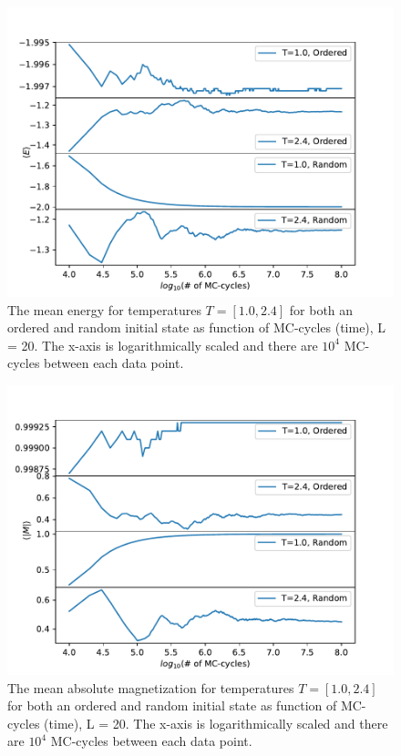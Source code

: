 \documentclass[12pt,english,a4paper]{article}
\begin{document}
\begin{figure}[H]
    \centering
    \includegraphics[scale=0.7]{Figures/Most_Likely_State_E_mean_L_20.pdf}
    \caption{The mean energy for temperatures $T=[1.0,2.4]$ for both an ordered and random initial state as function of MC-cycles (time), L = 20. The x-axis is logarithmically scaled and there are $10^4$ MC-cycles between each data point.}
    \label{fig:E_equiv}
\end{figure}
\begin{figure}[H]
    \centering
    \includegraphics[scale=0.7]{Figures/Most_Likely_State_M_abs_L_20.pdf}
    \caption{The mean absolute magnetization for temperatures $T=[1.0,2.4]$ for both an ordered and random initial state as function of MC-cycles (time), L = 20. The x-axis is logarithmically scaled and there are $10^4$ MC-cycles between each data point.}
    \label{fig:M_equiv}
\end{figure}
\end{document}
